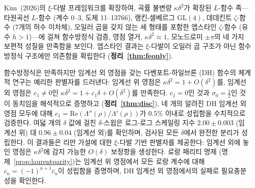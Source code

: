 \documentclass[11pt, a4paper]{article}
\theoremstyle{plain}
\theoremstyle{definition}
\begin{document}
\begin{tcolorbox}[
  colback=lightbg, colframe=zetaviolet!60!black,
  title={\bfseries 초록}, fonttitle=\large,
  arc=3pt, boxrule=0.8pt, toptitle=3pt, bottomtitle=3pt
]
Kim~(2026)의 $\xi$-다발 프레임워크를 확장하여,
곡률 불변량 $\kappa\delta^{2}$가 확장된 $L$-함수 족---
타원곡선 $L$-함수 (계수 0--3, 도체 11--13766),
랭킨-셀베르그 $\mathrm{GL}(4)$, 데데킨트
$\zeta$-함수 (7개의 허수 이차체), 오일러 곱을 갖지 않는
세 형태를 포함한 엡스타인 $\zeta$-함수 (유수 $h>1$)---에 걸쳐
함수방정식 검증, 영점 열거, $\kappa\delta^{2}\approx 1$,
모노드로미 $\pm\pi$의 네 가지 보편적 성질을 만족함을 보인다.
엡스타인 결과는 $\xi$-다발이 오일러 곱 구조가 아닌
함수방정식 구조에만 의존함을 확립한다
(\textbf{정리~\ref{thm:feonly}}).

함수방정식은 만족하지만 임계선 외 영점을 갖는
다벤포트-하일브론 (DH) 함수의 체계적 연구는
예리한 판별자를 드러낸다: 임계선 위 영점은
$\kappa\delta^{2} = 1 + O(\delta^{2})$를,
임계선 외 영점은 $c_{1}\neq 0$인
$\kappa\delta^{2} = 1 + c_{1}\delta + O(\delta^{2})$를 만족한다.
$c_{1} = 0$인 것과 $\sigma_{0}=\tfrac{1}{2}$인 것이
동치임을 해석적으로 증명하고 (\textbf{정리~\ref{thm:disc}}),
네 개의 알려진 DH 임계선 외 영점 모두에 대해
$c_{1} = \mathrm{Re}(\Lambda''(\rho)/\Lambda'(\rho))$가
$0.5\%$ 이내로 성립함을 수치적으로 검증한다.
여덟 개의 $\delta$ 값에 걸친 $\delta$-스윕은
로그-로그 스케일링 지수 $2.00\pm0.003$ (임계선 위)
대 $0.96\pm0.04$ (임계선 외)를 확인하며,
검사된 모든 $\delta$에서 완전한 분리가 성립한다.
이 결과들은 리만 가설에 대한 $\xi$-다발 기반 판별자를 제공한다:
임계선 외에 놓인 영점은 $\kappa\delta^{2}$에
감지 가능한 $O(\delta)$ 보정항을 생성한다.
로랑 패리티 명제 (명제~\ref{prop:laurentparity})는
임계선 위 영점에서 모든 로랑 계수에 대해
$c_n=(-1)^{n+1}\bar{c}_n$이 성립함을 증명하며,
DH 임계선 외 영점에서의 실패로 필요충분성을 확인한다.


\end{tcolorbox}
\end{document}
